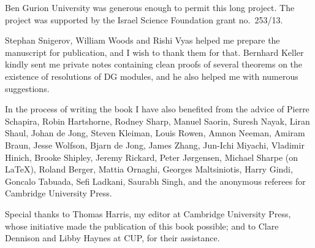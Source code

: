 Ben Gurion University was generous enough to permit this long project. The 
project was supported by the Israel Science Foundation grant no.\ 253/13. 

Stephan Snigerov, William Woods and Rishi Vyas helped me prepare the manuscript 
for publication, and I wish to thank them for that. Bernhard Keller kindly sent 
me private notes containing clean proofs of several theorems on the 
existence of resolutions of DG modules, and he also helped me with numerous 
suggestions. 

In the process of writing the book I have also benefited from the advice of 
Pierre Schapira, Robin Hartshorne, Rodney Sharp, 
Manuel Saorin, Suresh Nayak, Liran Shaul, Johan de Jong, Steven Kleiman, 
Louis Rowen, Amnon Neeman, Amiram Braun, Jesse Wolfson, 
Bjarn de Jong, James Zhang, Jun-Ichi Miyachi, Vladimir Hinich, 
Brooke Shipley, Jeremy Rickard, Peter J{\o}rgensen, 
Michael Sharpe (on LaTeX), Roland Berger, Mattia Ornaghi, Georges Maltsiniotis, 
Harry Gindi, Goncalo Tabuada, Sefi Ladkani, Saurabh Singh,
and the anonymous referees for Cambridge University Press. 

Special thanks to Thomas Harris, my editor at Cambridge University Press,  
whose initiative made the publication of this book possible; and to 
Clare Dennison and Libby Haynes at CUP, for their assistance.
